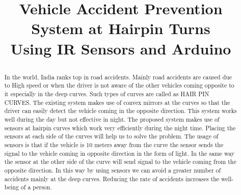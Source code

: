 \documentclass[conference]{IEEEtran}
\begin{document}
    \title{Vehicle Accident Prevention System at Hairpin Turns\\{
    \large Using IR Sensors and Arduino
    }

        }

    \author{
    \and
    \and
    \and
    \and

    }

    \maketitle

    \begin{abstract}
        In the world, India ranks top in road accidents. Mainly road accidents are caused due to High speed
        or when the driver is not aware of the other vehicles coming opposite to it especially in the deep curves.
        Such types of curves are called as HAIR PIN CURVES. The existing system makes use of convex mirrors
        at the curves so that the driver can easily detect the vehicle coming in the opposite direction. This system
        works well during the day but not effective in night. The proposed system makes use of sensors at hairpin
        curves which work very efficiently during the night time. Placing the sensors at each side of the curves will
        help us to solve the problem. The usage of sensors is that if the vehicle is 10 meters away from the curve the
        sensor sends the signal to the vehicle coming in opposite direction in the form of light. In the same way the
        sensor at the other side of the curve will send signal to the vehicle coming from the opposite direction. In
        this way by using sensors we can avoid a greater number of accidents mainly at the deep curves. Reducing
        the rate of accidents increases the well-being of a person.
    \end{abstract}
\end{document}
